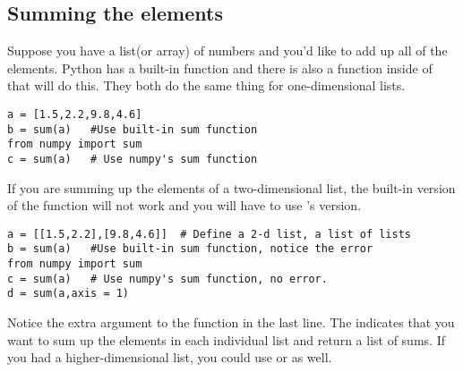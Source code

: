 \subsection*{Summing the elements}
Suppose you have a list(or array) of numbers and you'd like to add up
all of the elements.  Python has a built-in  function and
there is also a  function inside of  that
will do this. They both do the same thing for one-dimensional lists.
\begin{Verbatim}
a = [1.5,2.2,9.8,4.6]
b = sum(a)   #Use built-in sum function
from numpy import sum
c = sum(a)   # Use numpy's sum function
\end{Verbatim}
If you are summing up the elements of a two-dimensional list, the
built-in version of the function will not work and you will have to
use 's version.
\begin{Verbatim}
a = [[1.5,2.2],[9.8,4.6]]  # Define a 2-d list, a list of lists
b = sum(a)   #Use built-in sum function, notice the error
from numpy import sum
c = sum(a)   # Use numpy's sum function, no error.
d = sum(a,axis = 1)
\end{Verbatim}
Notice the extra argument to the  function in the last
line.  The  indicates that you want to sum up the
elements in each individual list and return a list of sums.  If you
had a higher-dimensional list, you could use  or
 as well.


